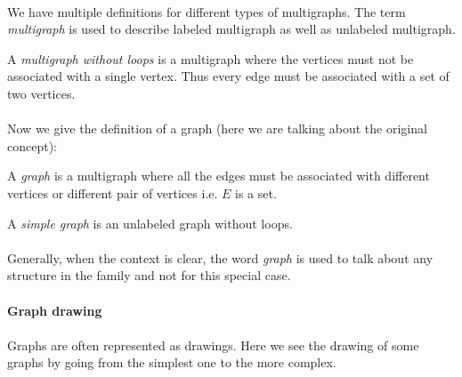 \paragraph{}
We have multiple definitions for different types of multigraphs. The term \textit{multigraph} is used to describe labeled multigraph as well as unlabeled multigraph.

\begin{definition}
  A \textit{multigraph without loops} is a multigraph where the vertices must not be associated with a single vertex. Thus every edge must be associated with a set of two vertices.
\end{definition}

\paragraph{}
Now we give the definition of a graph (here we are talking about the original concept):

\begin{definition}[Graph]
  A \textit{graph} is a multigraph where all the edges must be associated with different vertices or different pair of vertices i.e. $E$ is a set.
\end{definition}

\begin{definition}
  A \textit{simple graph} is an unlabeled graph without loops.
\end{definition}

\paragraph{}
Generally, when the context is clear, the word \textit{graph} is used to talk about any structure in the family and not for this special case.

\paragraph{}
\textbf{Graph drawing}

\paragraph{}
Graphs are often represented as drawings. Here we see the drawing of some graphs by going from the simplest one to the more complex.

